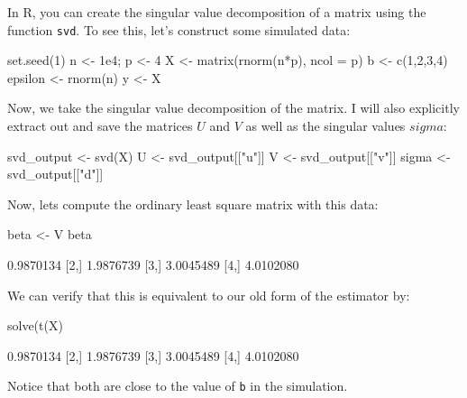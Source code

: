 \documentclass[12pt,hidelinks]{article}
\numberwithin{equation}{section}
\begin{document}
In R, you can create the singular value decomposition of a matrix using the
function \texttt{svd}. To see this, let's construct some simulated data:
\begin{rcode}
set.seed(1)
n <- 1e4; p <- 4
X <- matrix(rnorm(n*p), ncol = p)
b <- c(1,2,3,4)
epsilon <- rnorm(n)
y <- X %
\end{rcode}
Now, we take the singular value decomposition of the matrix. I will also
explicitly extract out and save the matrices $U$ and $V$ as well as the singular
values $sigma$:
\begin{rcode}
svd_output <- svd(X)
U <- svd_output[["u"]]
V <- svd_output[["v"]]
sigma <- svd_output[["d"]]
\end{rcode}
Now, lets compute the ordinary least square matrix with this data:
\begin{rcode}
beta <- V %
beta
\end{rcode}
\begin{rres}
          [,1]
[1,] 0.9870134
[2,] 1.9876739
[3,] 3.0045489
[4,] 4.0102080
\end{rres}
We can verify that this is equivalent to our old form of the estimator by:
\begin{rcode}
solve(t(X) %
\end{rcode}
\begin{rres}
          [,1]
[1,] 0.9870134
[2,] 1.9876739
[3,] 3.0045489
[4,] 4.0102080
\end{rres}
Notice that both are close to the value of \texttt{b} in the simulation.
\end{document}
